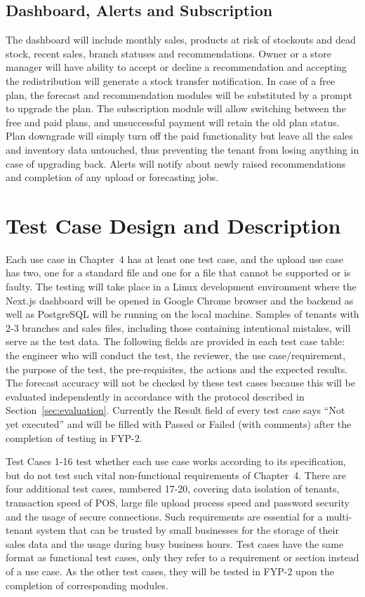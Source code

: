 \documentclass{StockSense}
\begin{document}
\subsection{Dashboard, Alerts and Subscription}

The dashboard will include monthly sales, products at risk of stockouts and dead stock, recent sales, branch statuses and recommendations. Owner or a store manager will have ability to accept or decline a recommendation and accepting the redistribution will generate a stock transfer notification. In case of a free plan, the forecast and recommendation modules will be substituted by a prompt to upgrade the plan. The subscription module will allow switching between the free and paid plans, and unsuccessful payment will retain the old plan status. Plan downgrade will simply turn off the paid functionality but leave all the sales and inventory data untouched, thus preventing the tenant from losing anything in case of upgrading back. Alerts will notify about newly raised recommendations and completion of any upload or forecasting jobs.

\section{Test Case Design and Description}

Each use case in Chapter~4 has at least one test case, and the upload use case has two, one for a standard file and one for a file that cannot be supported or is faulty. The testing will take place in a Linux development environment where the Next.js dashboard will be opened in Google Chrome browser and the backend as well as PostgreSQL will be running on the local machine. Samples of tenants with 2-3 branches and sales files, including those containing intentional mistakes, will serve as the test data. The following fields are provided in each test case table: the engineer who will conduct the test, the reviewer, the use case/requirement, the purpose of the test, the pre-requisites, the actions and the expected results. The forecast accuracy will not be checked by these test cases because this will be evaluated independently in accordance with the protocol described in Section~\ref{sec:evaluation}. Currently the Result field of every test case says ``Not yet executed'' and will be filled with Passed or Failed (with comments) after the completion of testing in FYP-2.

Test Cases 1-16 test whether each use case works according to its specification, but do not test such vital non-functional requirements of Chapter~4. There are four additional test cases, numbered 17-20, covering data isolation of tenants, transaction speed of POS, large file upload process speed and password security and the usage of secure connections. Such requirements are essential for a multi-tenant system that can be trusted by small businesses for the storage of their sales data and the usage during busy business hours. Test cases have the same format as functional test cases, only they refer to a requirement or section instead of a use case. As the other test cases, they will be tested in FYP-2 upon the completion of corresponding modules.
\end{document}
